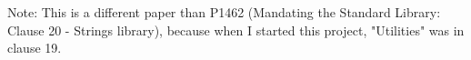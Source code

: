 Note: This is a different paper than P1462 (Mandating the Standard Library: Clause 20 - Strings library),
because when I started this project, "Utilities" was in clause 19.


%
%
